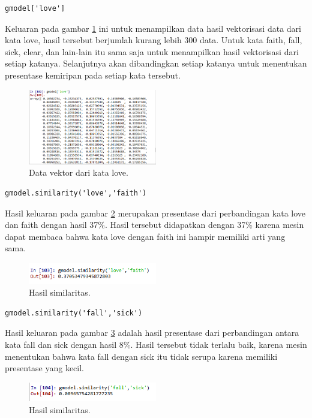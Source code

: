 \begin{enumerate}
\begin{verbatim}
gmodel['love']
\end{verbatim}
Keluaran pada gambar \ref{sim2} ini untuk menampilkan data hasil vektorisasi data dari kata love, hasil tersebut berjumlah kurang lebih 300 data. Untuk kata faith, fall, sick, clear, dan lain-lain itu sama saja untuk menampilkan hasil vektorisasi dari setiap katanya. Selanjutnya akan dibandingkan setiap katanya untuk menentukan presentase kemiripan pada setiap kata tersebut.
		\begin{figure}[!htbp]
		\centerline{\includegraphics[width=0.5\textwidth]{figures/im/sim2.png}}
		\caption{Data vektor dari kata love.}
		\label{sim2}
		\end{figure}

\begin{verbatim}
gmodel.similarity('love','faith')
\end{verbatim}
Hasil keluaran pada gambar \ref{sim3} merupakan presentase dari perbandingan kata love dan faith dengan hasil 37\%. Hasil tersebut didapatkan dengan 37\% karena mesin dapat membaca bahwa kata love dengan faith ini hampir memiliki arti yang sama.
		\begin{figure}[!htbp]
		\centerline{\includegraphics[width=0.5\textwidth]{figures/im/sim3.png}}
		\caption{Hasil similaritas.}
		\label{sim3}
		\end{figure}

\begin{verbatim}
gmodel.similarity('fall','sick')
\end{verbatim}
Hasil keluaran pada gambar \ref{sim4} adalah hasil presentase dari perbandingan antara kata fall dan sick dengan hasil 8\%. Hasil tersebut tidak terlalu baik, karena mesin menentukan bahwa kata fall dengan sick itu tidak serupa karena memiliki presentase yang kecil.
		\begin{figure}[!htbp]
		\centerline{\includegraphics[width=0.5\textwidth]{figures/im/sim4.png}}
		\caption{Hasil similaritas.}
		\label{sim4}
		\end{figure}


\end{enumerate}
